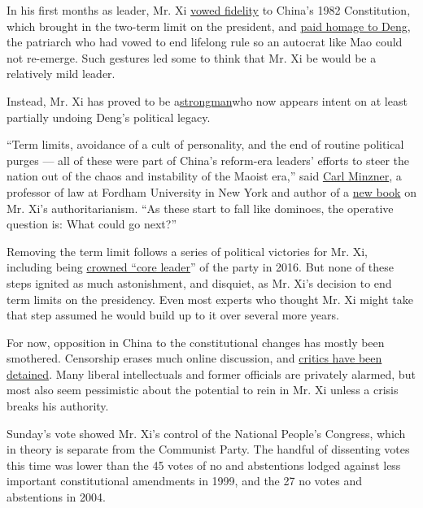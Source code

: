 In his first months as leader, Mr. Xi
\href{http://usa.chinadaily.com.cn/china/2012-12/05/content_15985894.htm}{vowed
fidelity} to China's 1982 Constitution, which brought in the two-term
limit on the president, and
\href{http://www.nytimes3xbfgragh.onion/2012/12/10/world/asia/chinese-leaders-visit-to-shenzhen-hints-at-reform.html}{paid
homage to Deng}, the patriarch who had vowed to end lifelong rule so an
autocrat like Mao could not re-emerge. Such gestures led some to think
that Mr. Xi be would be a relatively mild leader.

Instead, Mr. Xi has proved to be
a\href{https://www.nytimes3xbfgragh.onion/2018/02/26/world/asia/china-xi-jinping-authoritarianism.html}{strongman}who
now appears intent on at least partially undoing Deng's political
legacy.

``Term limits, avoidance of a cult of personality, and the end of
routine political purges --- all of these were part of China's
reform-era leaders' efforts to steer the nation out of the chaos and
instability of the Maoist era,'' said
\href{https://www.fordham.edu/info/23165/carl_minzner}{Carl Minzner}, a
professor of law at Fordham University in New York and author of a
\href{https://global.oup.com/academic/product/end-of-an-era-9780190672089?cc=us\&lang=en\&}{new
book} on Mr. Xi's authoritarianism. ``As these start to fall like
dominoes, the operative question is: What could go next?''

Removing the term limit follows a series of political victories for Mr.
Xi, including being
\href{https://www.nytimes3xbfgragh.onion/2016/10/28/world/asia/xi-jinping-china.html?_r=0}{crowned
``core leader}'' of the party in 2016. But none of these steps ignited
as much astonishment, and disquiet, as Mr. Xi's decision to end term
limits on the presidency. Even most experts who thought Mr. Xi might
take that step assumed he would build up to it over several more years.

For now, opposition in China to the constitutional changes has mostly
been smothered. Censorship erases much online discussion, and
\href{https://www.nytimes3xbfgragh.onion/2018/03/08/world/asia/china-xi-jinping-term-limits-dissent.html}{critics
have been detained}. Many liberal intellectuals and former officials are
privately alarmed, but most also seem pessimistic about the potential to
rein in Mr. Xi unless a crisis breaks his authority.

Sunday's vote showed Mr. Xi's control of the National People's Congress,
which in theory is separate from the Communist Party. The handful of
dissenting votes this time was lower than the 45 votes of no and
abstentions lodged against less important constitutional amendments in
1999, and the 27 no votes and abstentions in 2004.


